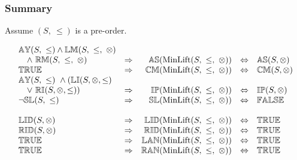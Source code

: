 \documentclass[../Summary.tex]{subfiles}
\begin{document}
\subsubsection{Summary}

Assume $(S,\ \leq)$ is a pre-order.

\[
\begin{array}{lcrcl} 
{\mathbb{AY}}(S,\ \leq) \wedge {\mathbb{LM}}(S,\ \leq,\ \otimes) \\
\ \ \ \wedge \ {\mathbb{RM}}(S,\ \leq,\ \otimes)
	& \Rightarrow
	& {\mathbb{AS}}(\mathrm{MinLift}(S,\ \leq,\ \otimes)) 
	& \Leftrightarrow 
	& {\mathbb{AS}}(S,\otimes)
	\\ 
{\mathbb{TRUE}}
	& \Rightarrow
	& {\mathbb{CM}}(\mathrm{MinLift}(S,\ \leq,\ \otimes)) 
	& \Leftrightarrow 
	& {\mathbb{CM}}(S,\otimes)
	\\ 
{\mathbb{AY}}(S,\ \leq) \ \wedge ({\mathbb{LI}}(S,\otimes,\leq) \\ 
\ \ \ \vee \ {\mathbb{RI}}(S,\otimes,\leq))
	& \Rightarrow
	& {\mathbb{IP}}(\mathrm{MinLift}(S,\ \leq,\ \otimes)) 
	& \Leftrightarrow
	& {\mathbb{IP}}(S,\otimes)
	\\ 
\neg {\mathbb{SL}}(S,\ \leq)
	& \Rightarrow
	& {\mathbb{SL}}(\mathrm{MinLift}(S,\ \leq,\ \otimes)) 
	& \Leftrightarrow 
	& {\mathbb{FALSE}}
	\\ \\
	
{\mathbb{LID}}(S, \otimes)
	& \Rightarrow
	& {\mathbb{LID}}(\mathrm{MinLift}(S,\ \leq,\ \otimes)) 
	& \Leftrightarrow 
	& {\mathbb{TRUE}}
	\\ 
{\mathbb{RID}}(S, \otimes)
	& \Rightarrow
	& {\mathbb{RID}}(\mathrm{MinLift}(S,\ \leq,\ \otimes)) 
	& \Leftrightarrow 
	& {\mathbb{TRUE}}
	\\ 
{\mathbb{TRUE}}
	& \Rightarrow
	& {\mathbb{LAN}}(\mathrm{MinLift}(S,\ \leq,\ \otimes)) 
	& \Leftrightarrow 
	& {\mathbb{TRUE}}
	\\
{\mathbb{TRUE}}
	& \Rightarrow
	& {\mathbb{RAN}}(\mathrm{MinLift}(S,\ \leq,\ \otimes)) 
	& \Leftrightarrow 
	& {\mathbb{TRUE}}
	\\\\
	

\end{array}\]
\end{document}

